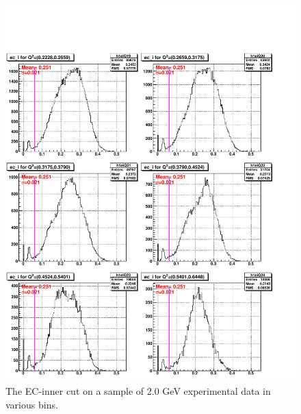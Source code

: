 \begin{figure}[H]%
\centering
\leavevmode \includegraphics[width=1.0\textwidth]{figuresEG4/FigCuts/ecCuts_eiOneD_Eb2_4ThN.pdf}  %
\caption[EC inner energy cut (Exp.)]{The EC-inner cut on a sample of 2.0 GeV experimental data in various \qsqs bins.}
\label{ecInExp6}
\end{figure}



